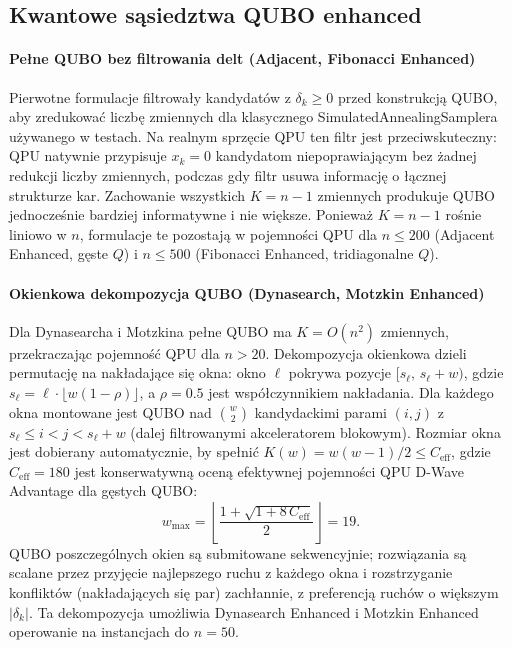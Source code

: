 \documentclass[11pt,a4paper]{article}
\begin{document}
\subsection{Kwantowe sąsiedztwa QUBO enhanced}
\label{sec:enhanced}

\paragraph{Pełne QUBO bez filtrowania delt \textup{(Adjacent, Fibonacci
Enhanced)}}
Pierwotne formulacje filtrowały kandydatów z $\delta_k\ge0$ przed
konstrukcją QUBO, aby zredukować liczbę zmiennych dla klasycznego
SimulatedAnnealingSamplera używanego w testach. Na realnym sprzęcie QPU
ten filtr jest przeciwskuteczny: QPU natywnie przypisuje $x_k=0$
kandydatom niepoprawiającym bez żadnej redukcji liczby zmiennych,
podczas gdy filtr usuwa informację o łącznej strukturze kar.
Zachowanie wszystkich $K=n-1$ zmiennych produkuje QUBO jednocześnie
bardziej informatywne i nie większe. Ponieważ $K=n-1$ rośnie liniowo
w $n$, formulacje te pozostają w pojemności QPU dla $n\le200$
(Adjacent Enhanced, gęste $Q$) i $n\le500$ (Fibonacci Enhanced,
tridiagonalne $Q$).

\paragraph{Okienkowa dekompozycja QUBO \textup{(Dynasearch, Motzkin
Enhanced)}}
Dla Dynasearcha i Motzkina pełne QUBO ma $K=O(n^2)$ zmiennych,
przekraczając pojemność QPU dla $n>20$. Dekompozycja okienkowa dzieli
permutację na nakładające się okna: okno $\ell$ pokrywa pozycje
$[s_\ell,\,s_\ell+w)$, gdzie $s_\ell=\ell\cdot\lfloor
w(1-\rho)\rfloor$, a $\rho=0.5$ jest współczynnikiem nakładania. Dla
każdego okna montowane jest QUBO nad $\binom{w}{2}$ kandydackimi
parami $(i,j)$ z $s_\ell\le i<j<s_\ell+w$ (dalej filtrowanymi
akceleratorem blokowym). Rozmiar okna jest dobierany automatycznie,
by spełnić $K(w)=w(w-1)/2\le C_{\mathrm{eff}}$, gdzie
$C_{\mathrm{eff}}=180$ jest konserwatywną oceną efektywnej pojemności
QPU D-Wave Advantage dla gęstych QUBO:
\begin{equation}
  w_{\max} = \left\lfloor \frac{1+\sqrt{1+8\,C_{\mathrm{eff}}}}{2}
  \right\rfloor = 19.
\end{equation}
QUBO poszczególnych okien są submitowane sekwencyjnie; rozwiązania są
scalane przez przyjęcie najlepszego ruchu z każdego okna
i rozstrzyganie konfliktów (nakładających się par) zachłannie,
z preferencją ruchów o większym $|\delta_k|$. Ta dekompozycja
umożliwia Dynasearch Enhanced i Motzkin Enhanced operowanie na
instancjach do $n=50$.
\end{document}
